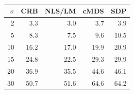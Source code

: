 \documentclass[10pt,a4paper,twocolumn]{extarticle}
\begin{document}
\par\vspace{3pt}\noindent\begin{minipage}{\columnwidth}
\centering
{}
\label{tab:noise}
\footnotesize
\setlength{\tabcolsep}{4pt}
\begin{tabular}{@{}rrrrr@{}}
\toprule
$\sigma$ & CRB & NLS/LM & cMDS & SDP\\
\midrule
2 & 3.3 & 3.0 & 3.7 & 3.9\\
5 & 8.3 & 7.5 & 9.6 & 10.5\\
10 & 16.2 & 17.0 & 19.9 & 20.9\\
15 & 24.8 & 22.5 & 29.3 & 29.9\\
20 & 36.9 & 35.5 & 44.6 & 46.1\\
30 & 50.7 & 51.6 & 64.6 & 64.2\\
\bottomrule
\end{tabular}
\end{minipage}\par\vspace{3pt}
\end{document}
